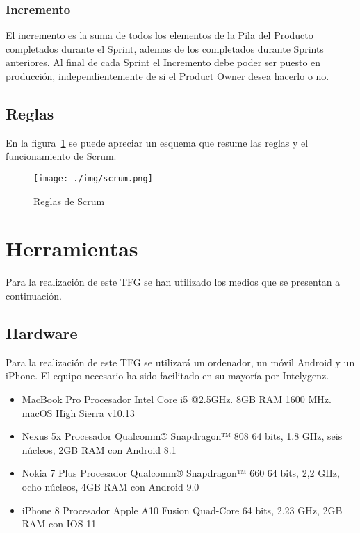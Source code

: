 \subsubsection{Incremento}

El incremento es la suma de todos los elementos de la Pila del Producto completados durante el Sprint, ademas
de los completados durante Sprints anteriores. Al final de cada Sprint el Incremento debe poder ser puesto en 
producción, independientemente de si el Product Owner desea hacerlo o no.

\subsection{Reglas}

En la figura~\ref{fig:scrum} se puede apreciar un esquema que resume las reglas y el funcionamiento de Scrum.

\begin{figure}[!h]
	\begin{center}
		\texttt{[image: ./img/scrum.png]}
		\caption{Reglas de Scrum}
		\label{fig:scrum}
	\end{center}
\end{figure}

\section{Herramientas}

Para la realización de este \acs{TFG} se han utilizado los medios que se presentan a continuación.

\subsection{Hardware}

Para la realización de este TFG se utilizará un ordenador, un móvil Android y un iPhone. El equipo 
necesario ha sido facilitado en su mayoría por Intelygenz.

\begin{itemize}
	\item MacBook Pro Procesador Intel Core i5 @2.5GHz. 8GB RAM 1600 MHz. macOS High Sierra v10.13
	\item Nexus 5x Procesador Qualcomm® Snapdragon™ 808 64 bits, 1.8 GHz, seis núcleos, 2GB RAM con Android 8.1
	\item Nokia 7 Plus Procesador Qualcomm® Snapdragon™ 660 64 bits, 2,2 GHz, ocho núcleos, 4GB RAM con Android 9.0
	\item iPhone 8 Procesador Apple A10 Fusion Quad-Core 64 bits, 2.23 GHz, 2GB RAM con IOS 11
\end{itemize}

